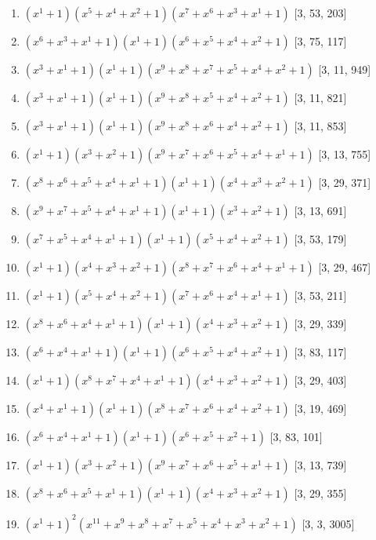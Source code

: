 \documentclass[10pt,twocolumn]{article}
\begin{document}
\begin{enumerate}
\item $(x^{1} + 1)(x^{5} + x^{4} + x^{2} + 1)(x^{7} + x^{6} + x^{3} + x^{1} + 1)$  [3, 53, 203]
\item $(x^{6} + x^{3} + x^{1} + 1)(x^{1} + 1)(x^{6} + x^{5} + x^{4} + x^{2} + 1)$  [3, 75, 117]
\item $(x^{3} + x^{1} + 1)(x^{1} + 1)(x^{9} + x^{8} + x^{7} + x^{5} + x^{4} + x^{2} + 1)$  [3, 11, 949]
\item $(x^{3} + x^{1} + 1)(x^{1} + 1)(x^{9} + x^{8} + x^{5} + x^{4} + x^{2} + 1)$  [3, 11, 821]
\item $(x^{3} + x^{1} + 1)(x^{1} + 1)(x^{9} + x^{8} + x^{6} + x^{4} + x^{2} + 1)$  [3, 11, 853]
\item $(x^{1} + 1)(x^{3} + x^{2} + 1)(x^{9} + x^{7} + x^{6} + x^{5} + x^{4} + x^{1} + 1)$  [3, 13, 755]
\item $(x^{8} + x^{6} + x^{5} + x^{4} + x^{1} + 1)(x^{1} + 1)(x^{4} + x^{3} + x^{2} + 1)$  [3, 29, 371]
\item $(x^{9} + x^{7} + x^{5} + x^{4} + x^{1} + 1)(x^{1} + 1)(x^{3} + x^{2} + 1)$  [3, 13, 691]
\item $(x^{7} + x^{5} + x^{4} + x^{1} + 1)(x^{1} + 1)(x^{5} + x^{4} + x^{2} + 1)$  [3, 53, 179]
\item $(x^{1} + 1)(x^{4} + x^{3} + x^{2} + 1)(x^{8} + x^{7} + x^{6} + x^{4} + x^{1} + 1)$  [3, 29, 467]
\item $(x^{1} + 1)(x^{5} + x^{4} + x^{2} + 1)(x^{7} + x^{6} + x^{4} + x^{1} + 1)$  [3, 53, 211]
\item $(x^{8} + x^{6} + x^{4} + x^{1} + 1)(x^{1} + 1)(x^{4} + x^{3} + x^{2} + 1)$  [3, 29, 339]
\item $(x^{6} + x^{4} + x^{1} + 1)(x^{1} + 1)(x^{6} + x^{5} + x^{4} + x^{2} + 1)$  [3, 83, 117]
\item $(x^{1} + 1)(x^{8} + x^{7} + x^{4} + x^{1} + 1)(x^{4} + x^{3} + x^{2} + 1)$  [3, 29, 403]
\item $(x^{4} + x^{1} + 1)(x^{1} + 1)(x^{8} + x^{7} + x^{6} + x^{4} + x^{2} + 1)$  [3, 19, 469]
\item $(x^{6} + x^{4} + x^{1} + 1)(x^{1} + 1)(x^{6} + x^{5} + x^{2} + 1)$  [3, 83, 101]
\item $(x^{1} + 1)(x^{3} + x^{2} + 1)(x^{9} + x^{7} + x^{6} + x^{5} + x^{1} + 1)$  [3, 13, 739]
\item $(x^{8} + x^{6} + x^{5} + x^{1} + 1)(x^{1} + 1)(x^{4} + x^{3} + x^{2} + 1)$  [3, 29, 355]
\item $(x^{1} + 1)^{2}(x^{11} + x^{9} + x^{8} + x^{7} + x^{5} + x^{4} + x^{3} + x^{2} + 1)$  [3, 3, 3005]

\end{enumerate}
\end{document}
